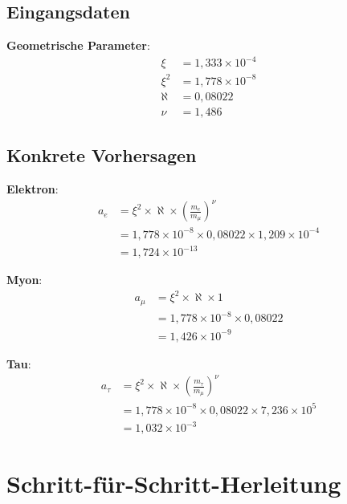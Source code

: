 \documentclass[12pt,a4paper]{article}
\newcommand{\xipar}{\xi}
\newcommand{\nulep}{\nu}
\begin{document}
	\subsection{Eingangsdaten}
	
	\textbf{Geometrische Parameter}:
	\begin{align}
		\xipar &= 1{,}333 \times 10^{-4} \\
		\xipar^2 &= 1{,}778 \times 10^{-8} \\
		\aleph &= 0{,}08022 \\
		\nulep &= 1{,}486
	\end{align}
	
	\subsection{Konkrete Vorhersagen}
	
	\textbf{Elektron}:
	\begin{align}
		a_e &= \xipar^2 \times \aleph \times \left(\frac{m_e}{m_\mu}\right)^\nulep \\
		&= 1{,}778 \times 10^{-8} \times 0{,}08022 \times 1{,}209 \times 10^{-4} \\
		&= 1{,}724 \times 10^{-13}
	\end{align}
	
	\textbf{Myon}:
	\begin{align}
		a_\mu &= \xipar^2 \times \aleph \times 1 \\
		&= 1{,}778 \times 10^{-8} \times 0{,}08022 \\
		&= 1{,}426 \times 10^{-9}
	\end{align}
	
	\textbf{Tau}:
	\begin{align}
		a_\tau &= \xipar^2 \times \aleph \times \left(\frac{m_\tau}{m_\mu}\right)^\nulep \\
		&= 1{,}778 \times 10^{-8} \times 0{,}08022 \times 7{,}236 \times 10^5 \\
		&= 1{,}032 \times 10^{-3}
	\end{align}
	
	\section{Schritt-für-Schritt-Herleitung}
	
\end{document}
